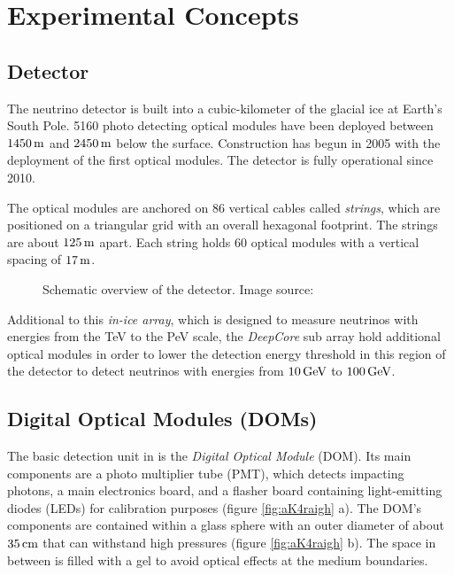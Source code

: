 \section{Experimental Concepts}
\label{sec:experimental_background}

\subsection{\icecube Detector}

The \icecube neutrino detector is built into a cubic-kilometer of the
glacial ice at Earth's South Pole. 5160 photo detecting optical modules
have been deployed between \(1450\text{\,m}\) and \(2450\text{\,m}\) below the surface.
Construction has begun in 2005 with the deployment of the first optical
modules. The detector is fully operational since 2010.
\cite{instrumentation}

The optical modules are anchored on 86 vertical cables called
\textit{strings}, which are positioned on a triangular grid with an
overall hexagonal footprint. The strings are about \(125\text{\,m}\) apart. Each
string holds 60 optical modules with a vertical spacing of \(17\text{\,m}\).
\cite{instrumentation}

\begin{figure}[htbp]
  \caption{Schematic overview of the \icecube detector. Image source: \cite{instrumentation}}
  \label{fig:aiThai0e}
\end{figure}

Additional to this \textit{in-ice array}, which is designed to measure
neutrinos with energies from the TeV to the PeV scale, the
\textit{DeepCore} sub array hold additional optical modules in order to
lower the detection energy threshold in this region of the detector to
detect neutrinos with energies from \(10\text{\,GeV}\) to \(100\text{\,GeV}\).
\cite{instrumentation}

\subsection{Digital Optical Modules (DOMs)}
\label{sec:doms}

The basic detection unit in \icecube is the
\textit{Digital Optical Module} (DOM). Its main components are a photo
multiplier tube (PMT), which detects impacting photons, a main
electronics board, and a flasher board containing light-emitting diodes
(LEDs) for calibration purposes (figure \ref{fig:aK4raigh} a). The DOM's
components are contained within a glass sphere with an outer diameter of
about \(35\text{\,cm}\) that can withstand high pressures (figure
\ref{fig:aK4raigh} b). The space in between is filled with a gel to
avoid optical effects at the medium boundaries. \cite{instrumentation}

